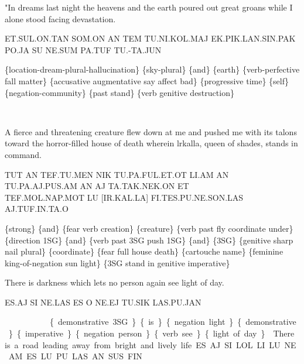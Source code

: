 {\drie 
 

"In dreams last night the heavens and the earth poured out great groans while I alone stood facing devastation.  

ET.SUL.ON.TAN SOM.ON AN TEM TU.NI.KOL.MAJ EK.PIK.LAN.SIN.PAK PO.JA SU NE.SUM PA.TUF TU.-TA.JUN 

\{location-dream-plural-hallucination\} \{sky-plural\} \{and\} \{earth\} \{verb-perfective fall matter\} \{accusative augmentative say affect bad\} \{progressive time\} \{self\} \{negation-community\} \{past stand\} \{verb genitive destruction\} 

 
\et\sul\on\Atlantan\som\on~\an~\tem~\tu\Atlanni\kol\maj
 
\drie 

A fierce and threatening creature flew down at me and pushed me with its talons toward the horror-filled house of death wherein lrkalla, queen of shades, stands in command.  

TUT AN TEF.TU.MEN NIK TU.PA.FUL.ET.OT LI.AM AN TU.PA.AJ.PUS.AM AN AJ TA.TAK.NEK.ON ET \\TEF.MOL.NAP.MOT LU [IR.KAL.LA] FI.TES.PU.NE.SON.LAS \\AJ.TUF.IN.TA.O 

\tut \an \tef\tu\men \nik \tu\pa\ful\et\ot \li\am \an \tu\pa\aj\pus\am \an \aj \ta\tak\nek\on \et \tef\mol\nap\mot \lu \cartouche{\il\kal\la} \Atlanfi\tes\pu\Atlanne\son\las \aj\tuf\Atlanin\ta\Atlano

\{strong\} \{and\} \{fear verb creation\} \{creature\} \{verb past fly coordinate under\} \{direction 1SG\} \{and\} \{verb past 3SG push 1SG\} \{and\} \{3SG\} \{genitive sharp nail plural\} \{coordinate\} \{fear full house death\} \{cartouche name\} \{feminine king-of-negation sun light\} \{3SG stand in genitive imperative\} 

 
 

There is darkness which lets no person again see light of day.  

 ES.AJ SI NE.LAS ES O NE.EJ TU.SIK LAS.PU.JAN 

\es\aj \si \Atlanne\la \es \Atlano \Atlanne\ej \tu\sik \las\pu\jan

 \{demonstrative 3SG\} \{is\} \{negation light\} \{demonstrative\} \{imperative\} \{negation person\} \{verb see\} \{light of day\} 

\drie 
 

There is a road leading away from bright and lively life.  
 ES.AJ SI LOL.LI.LU.NE.AM.ES.LU PU LAS AN SUS FIN 

}
